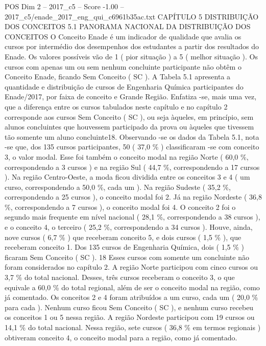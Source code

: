 \begin{textsample}{POS Dim 2 – 2017\_c5 – Score -1.00 – 2017\_c5/enade\_2017\_eng\_qui\_c6961b35ac.txt}  \label{ex:f2_pos_386}
CAPÍTULO 5 DISTRIBUIÇÃO DOS CONCEITOS 5.1 PANORAMA NACIONAL DA DISTRIBUIÇÃO DOS CONCEITOS O Conceito Enade é um indicador de qualidade que avalia os cursos por intermédio dos desempenhos dos estudantes a partir dos resultados do Enade.
Os valores possíveis vão de 1 ( pior situação ) a 5 ( melhor situação ).
Os cursos com apenas um ou sem nenhum concluinte participante não obtêm o Conceito Enade, ficando Sem Conceito ( SC ).
A Tabela 5.1 apresenta a quantidade e distribuição de cursos de Engenharia Química participantes do Enade/2017, por faixa de conceito e Grande Região.
Enfatiza -se, mais uma vez, que a diferença entre os cursos tabulados neste capítulo e no capítulo 2 corresponde aos cursos Sem Conceito ( SC ), ou seja àqueles, em princípio, sem alunos concluintes que houvessem participado da prova ou àqueles que tivessem tão somente um aluno concluinte18.
Observando -se os dados da Tabela 5.1, nota -se que, dos 135 cursos participantes, 50 ( 37,0 \% ) classificaram -se com conceito 3, o valor modal.
Esse foi também o conceito modal na região Norte ( 60,0 \%, correspondendo a 3 cursos ) e na região Sul ( 44,7 \%, correspondendo a 17 cursos ).
Na região Centro-Oeste, a moda ficou dividida entre os conceitos 3 e 4 ( um curso, correspondendo a 50,0 \%, cada um ).
Na região Sudeste ( 35,2 \%, correspondendo a 25 cursos ), o conceito modal foi 2.
Já na região Nordeste ( 36,8 \%, correspondendo a 7 cursos ), o conceito modal foi 4.
O conceito 2 foi o segundo mais frequente em nível nacional ( 28,1 \%, correspondendo a 38 cursos ), e o conceito 4, o terceiro ( 25,2 \%, correspondendo a 34 cursos ).
Houve, ainda, nove cursos ( 6,7 \% ) que receberam conceito 5, e dois cursos ( 1,5 \% ), que receberam conceito 1.
Dos 135 cursos de Engenharia Química, dois ( 1,5 \% ) ficaram Sem Conceito ( SC ). 18 Esses cursos com somente um concluinte não foram considerados no capítulo 2.
A região Norte participou com cinco cursos ou 3,7 \% do total nacional.
Desses, três cursos receberam o conceito 3, o que equivale a 60,0 \% do total regional, além de ser o conceito modal na região, como já comentado.
Os conceitos 2 e 4 foram atribuídos a um curso, cada um ( 20,0 \% para cada ).
Nenhum curso ficou Sem Conceito ( SC ), e nenhum curso recebeu os conceitos 1 ou 5 nessa região.
A região Nordeste participou com 19 cursos ou 14,1 \% do total nacional.
Nessa região, sete cursos ( 36,8 \% em termos regionais ) obtiveram conceito 4, o conceito modal para a região, como já comentado.

\end{textsample}
